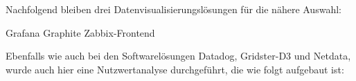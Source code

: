 {Nachfolgend bleiben drei Datenvisualisierungslösungen für die nähere Auswahl:

\begin{outline}
  \1 Grafana
  \1 Graphite
  \1 Zabbix\hyp{}Frontend
\end{outline}

Ebenfalls wie auch bei den Softwarelösungen Datadog, Gridster\hyp{}D3 und Netdata,
wurde auch hier eine Nutzwertanalyse durchgeführt, die wie folgt aufgebaut ist:

\begin{table}[H]
\caption{Nutzwertanalyse Grafana, Graphite und Zabbix-Frontend}
\label{nwa_ggz}
\end{table}

}
